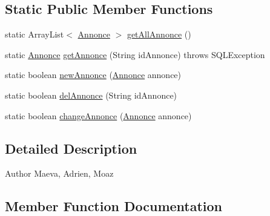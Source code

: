 \subsection*{Static Public Member Functions}
\begin{DoxyCompactItemize}
\item 
static Array\+List$<$ \hyperlink{classcom_1_1ecetech_1_1bti4_1_1itproject_1_1classified_1_1beans_1_1_annonce}{Annonce} $>$ \hyperlink{classcom_1_1ecetech_1_1bti4_1_1itproject_1_1classified_1_1dao_1_1_annonce_d_a_o_a43c4df5f208c931332cb925dc1d0214b}{get\+All\+Annonce} ()
\item 
static \hyperlink{classcom_1_1ecetech_1_1bti4_1_1itproject_1_1classified_1_1beans_1_1_annonce}{Annonce} \hyperlink{classcom_1_1ecetech_1_1bti4_1_1itproject_1_1classified_1_1dao_1_1_annonce_d_a_o_a72ad95094dc897fd58458aedf68fba7f}{get\+Annonce} (String id\+Annonce)  throws S\+Q\+L\+Exception 
\item 
static boolean \hyperlink{classcom_1_1ecetech_1_1bti4_1_1itproject_1_1classified_1_1dao_1_1_annonce_d_a_o_aab92a2bd9bb1c898f4f86c702b8e9513}{new\+Annonce} (\hyperlink{classcom_1_1ecetech_1_1bti4_1_1itproject_1_1classified_1_1beans_1_1_annonce}{Annonce} annonce)
\item 
static boolean \hyperlink{classcom_1_1ecetech_1_1bti4_1_1itproject_1_1classified_1_1dao_1_1_annonce_d_a_o_a3aa4c426e9f0faf21c617de92d57a7a4}{del\+Annonce} (String id\+Annonce)
\item 
static boolean \hyperlink{classcom_1_1ecetech_1_1bti4_1_1itproject_1_1classified_1_1dao_1_1_annonce_d_a_o_a8e467f67071507e30e8811c1e52f7331}{change\+Annonce} (\hyperlink{classcom_1_1ecetech_1_1bti4_1_1itproject_1_1classified_1_1beans_1_1_annonce}{Annonce} annonce)
\end{DoxyCompactItemize}


\subsection{Detailed Description}
\begin{DoxyAuthor}{Author}
Maeva, Adrien, Moaz 
\end{DoxyAuthor}


\subsection{Member Function Documentation}
